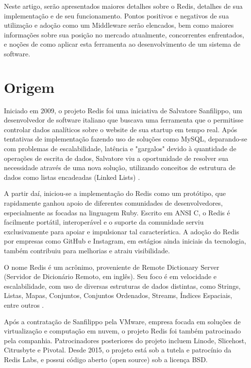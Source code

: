 \documentclass[12pt]{article}
\begin{document}
Neste artigo, serão apresentados maiores detalhes sobre o Redis, detalhes de sua implementação e de seu funcionamento. Pontos positivos e negativos de sua utilização e adoção como um Middleware serão elencados, bem como maiores informações sobre sua posição no mercado atualmente, concorrentes enfrentados, e noções de como aplicar esta ferramenta ao desenvolvimento de um sistema de software.

\section{Origem}

Iniciado em 2009, o projeto Redis foi uma iniciativa de Salvatore Sanfilippo, um desenvolvedor de software italiano que buscava uma ferramenta que o permitisse controlar dados analíticos sobre o website de sua startup em tempo real. Após tentativas de implementação fazendo uso de soluções como MySQL, deparando-se com problemas de escalabilidade, latência e "gargalos" devido à quantidade de operações de escrita de dados, Salvatore viu a oportunidade de resolver sua necessidade através de uma nova solução, utilizando conceitos de estrutura de dados como listas encadeadas (Linked Lists) \cite{bernardi2011}.

A partir daí, iniciou-se a implementação do Redis como um protótipo, que rapidamente ganhou apoio de diferentes comunidades de desenvolvedores, especialmente as focadas na linguagem Ruby. Escrito em ANSI C, o Redis é facilmente portátil, interoperável e o suporte da comunidade serviu exclusivamente para apoiar e impulsionar tal característica. A adoção do Redis por empresas como GitHub e Instagram, em estágios ainda iniciais da tecnologia, também contribuiu para melhorias e atraiu visibilidade.

O nome Redis é um acrônimo, proveniente de Remote Dictionary Server (Servidor de Dicionário Remoto, em inglês). Seu foco é em velocidade e escalabilidade, com uso de diversas estruturas de dados distintas, como Strings, Listas, Mapas, Conjuntos, Conjuntos Ordenados, Streams, Índices Espaciais, entre outros \cite{redis2020}.

Após a contratação de Sanfilippo pela VMware, empresa focada em soluções de virtualização e computação em nuvem, o projeto Redis foi também patrocinado pela companhia. Patrocinadores posteriores do projeto incluem Linode, Slicehost, Citrusbyte e Pivotal. Desde 2015, o projeto está sob a tutela e patrocínio da Redis Labs, e possui código aberto (open source) sob a licença BSD.
\end{document}
